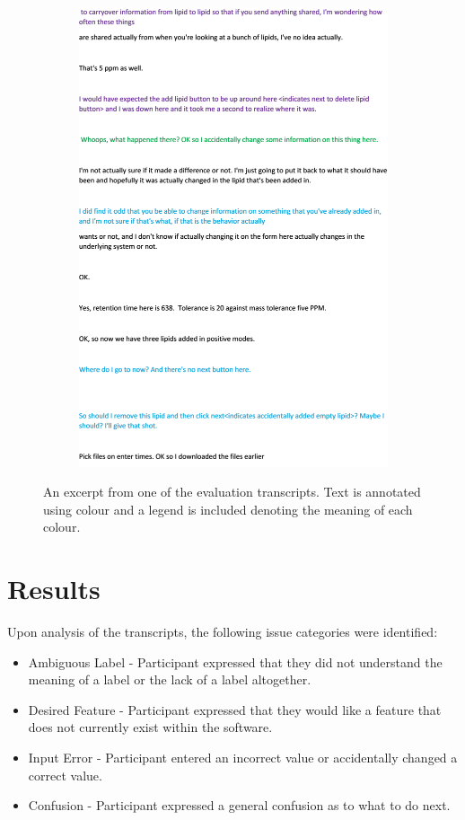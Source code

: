 \documentclass{l4proj}
\begin{document}
\begin{figure}[htb]
\begin{subfigure}{0.5\textwidth}
        \centering
        \includegraphics[width=\textwidth]{dissertation/images/transcript_page_2.png}    
        
        \label{fig:final} 
    \end{subfigure}
    \caption{An excerpt from one of the evaluation transcripts. Text is annotated using colour and a legend is included denoting the meaning of each colour.}
\end{figure}

\section{Results}
Upon analysis of the transcripts, the following issue categories were identified:
\begin{itemize}
    \item Ambiguous Label - Participant expressed that they did not understand the meaning of a label or the lack of a label altogether.
    \item Desired Feature - Participant expressed that they would like a feature that does not currently exist within the software.
    \item Input Error - Participant entered an incorrect value or accidentally changed a correct value.
    \item Confusion - Participant expressed a general confusion as to what to do next.
\end{itemize}
\end{document}
